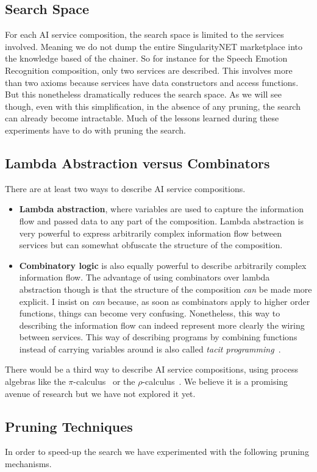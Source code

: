 \documentclass[]{report}
\begin{document}
\subsection{Search Space}
For each AI service composition, the search space is limited to the
services involved.  Meaning we do not dump the entire SingularityNET
marketplace into the knowledge based of the chainer.  So for instance
for the Speech Emotion Recognition composition, only two services are
described.  This involves more than two axioms because services have
data constructors and access functions.  But this nonetheless
dramatically reduces the search space.  As we will see though, even
with this simplification, in the absence of any pruning, the search
can already become intractable.  Much of the lessons learned during
these experiments have to do with pruning the search.
\subsection{Lambda Abstraction versus Combinators}
There are at least two ways to describe AI service compositions.
\begin{itemize}
\item \textbf{Lambda abstraction}, where variables are used to capture
  the information flow and passed data to any part of the composition.
  Lambda abstraction is very powerful to express arbitrarily complex
  information flow between services but can somewhat obfuscate the
  structure of the composition.
\item \textbf{Combinatory logic} is also equally powerful to describe
  arbitrarily complex information flow.  The advantage of using
  combinators over lambda abstraction though is that the structure of
  the composition \emph{can} be made more explicit.  I insist on
  \emph{can} because, as soon as combinators apply to higher order
  functions, things can become very confusing.  Nonetheless, this way
  to describing the information flow can indeed represent more clearly
  the wiring between services.  This way of describing programs by
  combining functions instead of carrying variables around is also
  called \emph{tacit programming}~\cite{enwiki:1283676462}.
\end{itemize}
There would be a third way to describe AI service compositions, using
process algebras like the $\pi$-calculus~\cite{Milner1999} or the
$\rho$-calculus~\cite{Meredith2005}.  We believe it is a promising
avenue of research but we have not explored it yet.

\subsection{Pruning Techniques}
In order to speed-up the search we have experimented with the
following pruning mechanisms.
\end{document}
